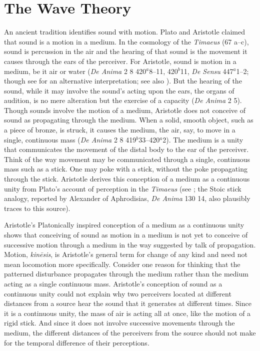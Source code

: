 \section{The Wave Theory} %
\label{sec:the_wave_theory}

An ancient tradition identifies sound with motion. Plato and Aristotle claimed that sound is a motion in a medium. In the cosmology of the \emph{Timaeus} (67 a--c), sound is percussion in the air and the hearing of that sound is the movement it causes through the ears of the perceiver. For Aristotle, sound is motion in a medium, be it air or water (\emph{De Anima} 2 8 420\( ^{a} \)8--11, 420\( ^{b} \)11, \emph{De Sensu} 447\( ^{a} \)1--2; though see \citealt[60--1]{OCallaghan:2007xy} for an alternative interpretation; see also \citealt{Johnstone:2013la}). But the hearing of the sound, while it may involve the sound's acting upon the ears, the organs of audition, is no mere alteration but the exercise of a capacity (\emph{De Anima} 2 5). Though sounds involve the motion of a medium, Aristotle does not conceive of sound as propagating through the medium. When a solid, smooth object, such as a piece of bronze, is struck, it causes the medium, the air, say, to move in a single, continuous mass (\emph{De Anima} 2 8 419\( ^{b} \)33--420\( ^{a} \)2). The medium is a unity that communicates the movement of the distal body to the ear of the perceiver. Think of the way movement may be communicated through a single, continuous mass such as a stick. One may poke with a stick, without the poke propagating through the stick. Aristotle derives this conception of a medium as a continuous unity from Plato's account of perception in the \emph{Timaeus} (see \citealt[chapter 1]{Lindberg:1977aa}; the Stoic stick analogy, reported by Alexander of Aphrodisias, \emph{De Anima} 130 14, also plausibly traces to this source). 

Aristotle's Platonically inspired conception of a medium as a continuous unity shows that conceiving of sound as motion in a medium is not yet to conceive of successive motion through a medium in the way suggested by talk of propagation. Motion, \emph{kinēsis}, is Aristotle's general term for change of any kind and need not mean locomotion more specifically. Consider one reason for thinking that the patterned disturbance propagates through the medium rather than the medium acting as a single continuous mass. Aristotle's conception of sound as a continuous unity could not explain why two perceivers located at different distances from a source hear the sound that it generates at different times. Since it is a continuous unity, the mass of air is acting all at once, like the motion of a rigid stick. And since it does not involve successive movements through the medium, the different distances of the perceivers from the source should not make for the temporal difference of their perceptions. 

